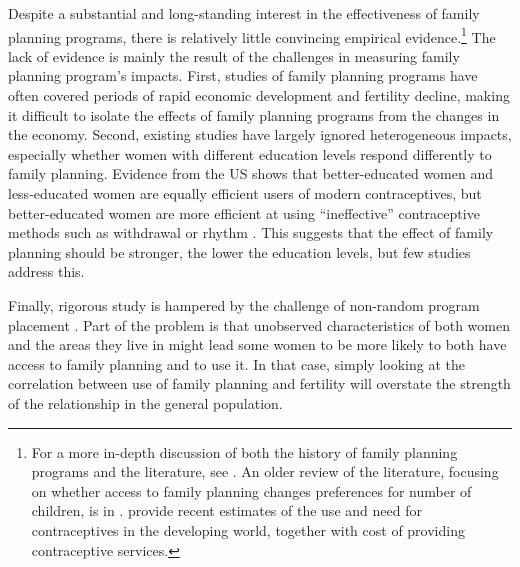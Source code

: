 \documentclass[]{article}
\begin{document}
Despite a substantial and long-standing interest in the effectiveness of family planning programs, there is relatively little convincing empirical evidence.\footnote{For a more in-depth discussion of both the history of family planning programs and the literature, see \citet{Miller2016}. An older review of the literature, focusing on whether access to family planning changes preferences for number of children, is in \citet{Freedman1997}. \citet{Singh2012} provide recent estimates of the use and need for contraceptives in the developing world, together with cost of providing contraceptive services.} The lack of evidence is mainly the result of the challenges in measuring family planning program's impacts. First, studies of family planning programs have often covered periods of rapid economic development and fertility decline, making it difficult to isolate the effects of family planning programs from the changes in the economy. Second, existing studies have largely ignored heterogeneous impacts, especially whether women with different education levels respond differently to family planning. Evidence from the US shows that better-educated women and less-educated women are equally efficient users of modern contraceptives, but better-educated women are more efficient at using ``ineffective'' contraceptive methods such as withdrawal or rhythm \citep{Rosenzweig1989}. This suggests that the effect of family planning should be stronger, the lower the education levels, but few studies address this.


Finally, rigorous study is hampered by the challenge of non-random program placement \citep{rosenzweig86,pitt93}. Part of the problem is that unobserved characteristics of both women and the areas they live in might lead some women to be more likely to both have access to family planning and to use it. In that case, simply looking at the correlation between use of family planning and fertility will overstate the strength of the relationship in the general population.
\end{document}
